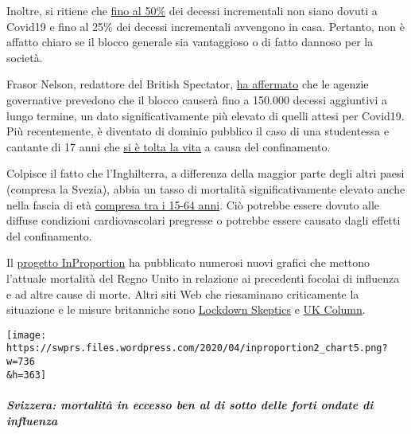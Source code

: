 Inoltre, si ritiene che \href{https://archive.is/2eKCW}{fino al 50\%}
dei decessi incrementali non siano dovuti a Covid19 e fino al 25\% dei
decessi incrementali avvengono in casa. Pertanto, non è affatto chiaro
se il blocco generale sia vantaggioso o di fatto dannoso per la società.

Frasor Nelson, redattore del British Spectator,
\href{https://www.telegraph.co.uk/politics/2020/04/09/boris-worried-lockdown-has-gone-far-can-end/}{ha
affermato} che le agenzie governative prevedono che il blocco causerà
fino a 150.000 decessi aggiuntivi a lungo termine, un dato
significativamente più elevato di quelli attesi per Covid19. Più
recentemente, è diventato di dominio pubblico il caso di una studentessa
e cantante di 17 anni che
\href{https://sports.yahoo.com/coronavirus-bethany-palmer-teenager-death-suicide-152707750.html}{si
è tolta la vita} a causa del confinamento.

Colpisce il fatto che l'Inghilterra, a differenza della maggior parte
degli altri paesi (compresa la Svezia), abbia un tasso di mortalità
significativamente elevato anche nella fascia di età
\href{https://www.euromomo.eu/}{compresa tra i 15-64 anni}. Ciò potrebbe
essere dovuto alle diffuse condizioni cardiovascolari pregresse o
potrebbe essere causato dagli effetti del confinamento.

Il \href{http://inproportion2.talkigy.com/}{progetto InProportion} ha
pubblicato numerosi nuovi grafici che mettono l'attuale mortalità del
Regno Unito in relazione ai precedenti focolai di influenza e ad altre
cause di morte. Altri siti Web che riesaminano criticamente la
situazione e le misure britanniche sono
\href{https://lockdownsceptics.org/}{Lockdown Skeptics} e
\href{https://www.ukcolumn.org/}{UK Column}.

\texttt{[image: https://swprs.files.wordpress.com/2020/04/inproportion2\_chart5.png?w=736\\\&h=363]}

\hypertarget{svizzera-mortalituxe0-in-eccesso-ben-al-di-sotto-delle-forti-ondate-di-influenza}{%
\subparagraph{\texorpdfstring{\textbf{Svizzera: mortalità in eccesso ben
al di sotto delle forti ondate di
influenza}}{Svizzera: mortalità in eccesso ben al di sotto delle forti ondate di influenza}}\label{svizzera-mortalituxe0-in-eccesso-ben-al-di-sotto-delle-forti-ondate-di-influenza}}

